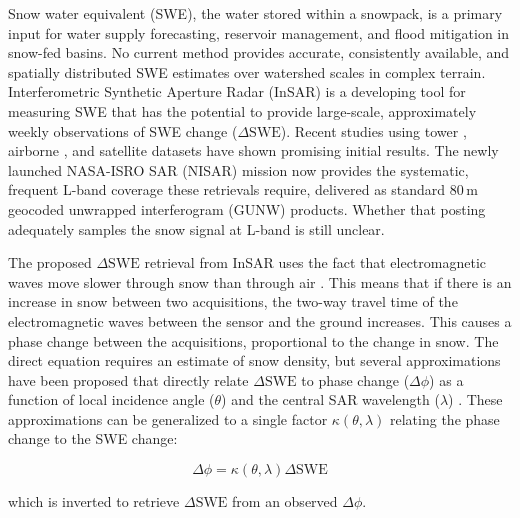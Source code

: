 \documentclass[tc, manuscript]{copernicus}
\begin{document}
\introduction  %
Snow water equivalent (SWE), the water stored within a snowpack, is a primary input for water supply forecasting, reservoir management, and flood mitigation in snow-fed basins. No current method provides accurate, consistently available, and spatially distributed SWE estimates over watershed scales in complex terrain. Interferometric Synthetic Aperture Radar (InSAR) is a developing tool for measuring SWE that has the potential to provide large-scale, approximately weekly observations of SWE change ($\Delta\mathrm{SWE}$). Recent studies using tower \citep{Leinss2015, Ruiz2021}, airborne \citep{Marshall2021, Nagler2022, Tarricone2023, Hoppinen2023w2, palomaki2025spatiotemporal-df9, Bonnell2024}, and satellite \citep{Belinska2022, Oveisgharan2024, ruiz2024} datasets have shown promising initial results. The newly launched NASA-ISRO SAR (NISAR) mission now provides the systematic, frequent L-band coverage these retrievals require, delivered as standard 80\,\unit{m} geocoded unwrapped interferogram (GUNW) products. Whether that posting adequately samples the snow signal at L-band is still unclear.

The proposed $\Delta\mathrm{SWE}$ retrieval from InSAR uses the fact that electromagnetic waves move slower through snow than through air \citep{Guneriussen2001, Leinss2015}. This means that if there is an increase in snow between two acquisitions, the two-way travel time of the electromagnetic waves between the sensor and the ground increases. This causes a phase change between the acquisitions, proportional to the change in snow. The direct equation requires an estimate of snow density, but several approximations have been proposed that directly relate $\Delta\mathrm{SWE}$ to phase change ($\Delta\phi$) as a function of local incidence angle ($\theta$) and the central SAR wavelength ($\lambda$) \citep{Leinss2015, Oveisgharan2024}. These approximations can be generalized to a single factor $\kappa(\theta,\lambda)$ relating the phase change to the SWE change:

\begin{equation}\label{eq:dswe2dphi}
    \Delta\phi = \kappa (\theta, \lambda) \Delta\mathrm{SWE}
\end{equation}

\noindent which is inverted to retrieve $\Delta\mathrm{SWE}$ from an observed $\Delta\phi$.
\end{document}
